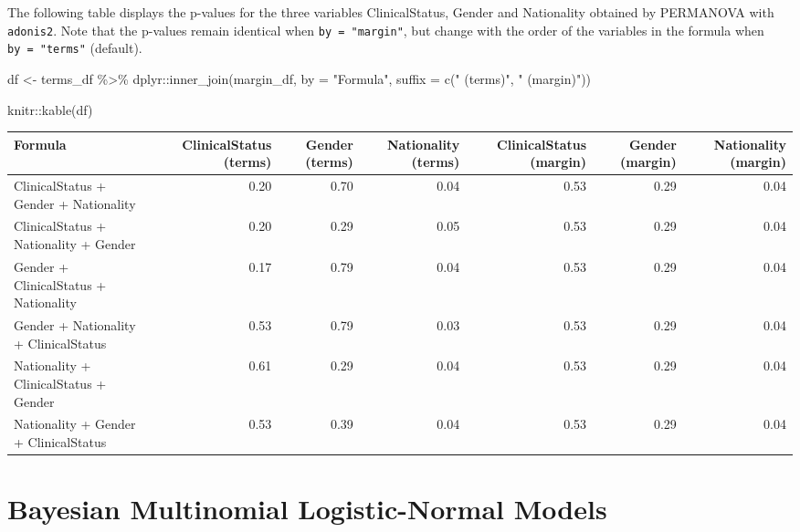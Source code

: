 \documentclass[
]{book}
\newenvironment{Shaded}{\begin{snugshade}}{\end{snugshade}}
\newcommand{\AttributeTok}[1]{\textcolor[rgb]{0.77,0.63,0.00}{#1}}
\newcommand{\FunctionTok}[1]{\textcolor[rgb]{0.00,0.00,0.00}{#1}}
\newcommand{\NormalTok}[1]{#1}
\newcommand{\OtherTok}[1]{\textcolor[rgb]{0.56,0.35,0.01}{#1}}
\newcommand{\SpecialCharTok}[1]{\textcolor[rgb]{0.00,0.00,0.00}{#1}}
\newcommand{\StringTok}[1]{\textcolor[rgb]{0.31,0.60,0.02}{#1}}
\begin{document}
The following table displays the p-values for the three variables
ClinicalStatus, Gender and Nationality obtained by PERMANOVA with
\texttt{adonis2}. Note that the p-values remain identical when \texttt{by\ =\ "margin"}, but change with the order of the variables in the
formula when \texttt{by\ =\ "terms"} (default).

\begin{Shaded}
\begin{Highlighting}[]
\NormalTok{df }\OtherTok{\textless{}{-}}\NormalTok{ terms\_df }\SpecialCharTok{\%\textgreater{}\%}
\NormalTok{  dplyr}\SpecialCharTok{::}\FunctionTok{inner\_join}\NormalTok{(margin\_df, }\AttributeTok{by =} \StringTok{"Formula"}\NormalTok{, }\AttributeTok{suffix =} \FunctionTok{c}\NormalTok{(}\StringTok{" (terms)"}\NormalTok{, }\StringTok{" (margin)"}\NormalTok{))}

\NormalTok{knitr}\SpecialCharTok{::}\FunctionTok{kable}\NormalTok{(df)}
\end{Highlighting}
\end{Shaded}

\begin{tabular}{l|r|r|r|r|r|r}
\hline
Formula & ClinicalStatus (terms) & Gender (terms) & Nationality (terms) & ClinicalStatus (margin) & Gender (margin) & Nationality (margin)\\
\hline
ClinicalStatus + Gender + Nationality & 0.20 & 0.70 & 0.04 & 0.53 & 0.29 & 0.04\\
\hline
ClinicalStatus + Nationality + Gender & 0.20 & 0.29 & 0.05 & 0.53 & 0.29 & 0.04\\
\hline
Gender + ClinicalStatus + Nationality & 0.17 & 0.79 & 0.04 & 0.53 & 0.29 & 0.04\\
\hline
Gender + Nationality + ClinicalStatus & 0.53 & 0.79 & 0.03 & 0.53 & 0.29 & 0.04\\
\hline
Nationality + ClinicalStatus + Gender & 0.61 & 0.29 & 0.04 & 0.53 & 0.29 & 0.04\\
\hline
Nationality + Gender + ClinicalStatus & 0.53 & 0.39 & 0.04 & 0.53 & 0.29 & 0.04\\
\hline
\end{tabular}

\hypertarget{bayesian-multinomial-logistic-normal-models}{%
\section{Bayesian Multinomial Logistic-Normal Models}\label{bayesian-multinomial-logistic-normal-models}}
\end{document}
